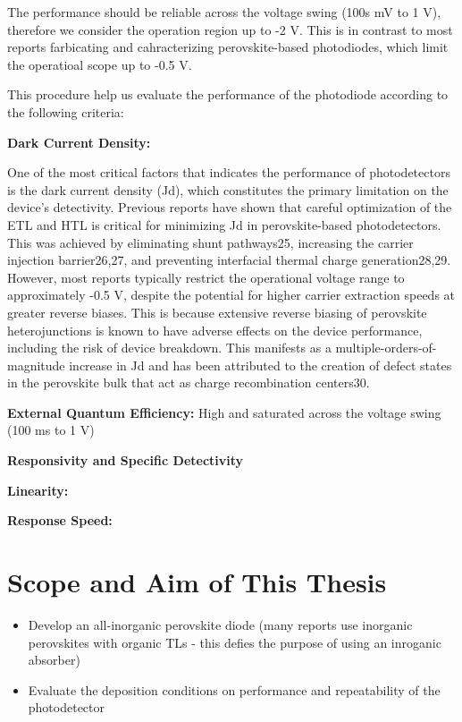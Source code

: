 The performance should be reliable across the voltage swing (100s mV to 1 V), therefore we consider the operation region up to -2 V. This is in contrast to most reports farbicating and cahracterizing perovskite-based photodiodes, which limit the operatioal scope up to -0.5 V.

This procedure help us evaluate the performance of the photodiode according to the following criteria: 

\textbf{Dark Current Density:}

One of the most critical factors that indicates the performance of photodetectors is the dark current density (Jd), which constitutes the primary limitation on the device’s detectivity. Previous reports have shown that careful optimization of the ETL and HTL is critical for minimizing Jd in perovskite-based photodetectors. This was achieved by eliminating shunt pathways25, increasing the carrier injection barrier26,27, and preventing interfacial thermal charge generation28,29. However, most reports typically restrict the operational voltage range to approximately -0.5 V, despite the potential for higher carrier extraction speeds at greater reverse biases. This is because extensive reverse biasing of perovskite heterojunctions is known to have adverse effects on the device performance, including the risk of device breakdown. This manifests as a multiple-orders-of-magnitude increase in Jd and has been attributed to the creation of defect states in the perovskite bulk that act as charge recombination centers30. 

\textbf{External Quantum Efficiency:}
High and saturated across the voltage swing (100 ms to 1 V)

\textbf{Responsivity and Specific Detectivity}

\textbf{Linearity:}

\textbf{Response Speed:}


\section{Scope and Aim of This Thesis}

\begin{itemize}
    \item Develop an all-inorganic perovskite diode (many reports use inorganic perovskites with organic TLs - this defies the purpose of using an inroganic absorber)
    \item Evaluate the deposition conditions on performance and repeatability of the photodetector
\end{itemize}


\cleardoublepage

